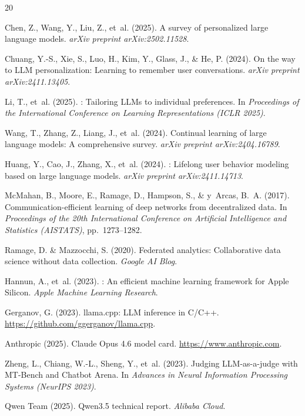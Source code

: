\documentclass[11pt,a4paper]{article}
\begin{document}
\begin{thebibliography}{20}

Chen, Z., Wang, Y., Liu, Z., et~al. (2025).
\newblock A survey of personalized large language models.
\newblock \emph{arXiv preprint arXiv:2502.11528}.

Chuang, Y.-S., Xie, S., Luo, H., Kim, Y., Glass, J., \& He, P. (2024).
\newblock On the way to {LLM} personalization: Learning to remember user
  conversations.
\newblock \emph{arXiv preprint arXiv:2411.13405}.

Li, T., et~al. (2025).
: Tailoring {LLMs} to individual preferences.
\newblock In \emph{Proceedings of the International Conference on Learning
  Representations (ICLR 2025)}.

Wang, T., Zhang, Z., Liang, J., et~al. (2024).
\newblock Continual learning of large language models: A comprehensive survey.
\newblock \emph{arXiv preprint arXiv:2404.16789}.

Huang, Y., Cao, J., Zhang, X., et~al. (2024).
: Lifelong user behavior modeling based on large language
  models.
\newblock \emph{arXiv preprint arXiv:2411.14713}.

McMahan, B., Moore, E., Ramage, D., Hampson, S., \& y~Arcas, B.~A. (2017).
\newblock Communication-efficient learning of deep networks from decentralized
  data.
\newblock In \emph{Proceedings of the 20th International Conference on
  Artificial Intelligence and Statistics (AISTATS)}, pp.\ 1273--1282.

Ramage, D. \& Mazzocchi, S. (2020).
\newblock Federated analytics: Collaborative data science without data
  collection.
\newblock \emph{Google AI Blog}.

Hannun, A., et~al. (2023).
: An efficient machine learning framework for {Apple Silicon}.
\newblock \emph{Apple Machine Learning Research}.

Gerganov, G. (2023).
\newblock llama.cpp: {LLM} inference in {C/C++}.
\newblock \url{https://github.com/ggerganov/llama.cpp}.

Anthropic (2025).
\newblock Claude {Opus} 4.6 model card.
\newblock \url{https://www.anthropic.com}.

Zheng, L., Chiang, W.-L., Sheng, Y., et~al. (2023).
\newblock Judging {LLM}-as-a-judge with {MT-Bench} and {Chatbot Arena}.
\newblock In \emph{Advances in Neural Information Processing Systems (NeurIPS
  2023)}.

Qwen Team (2025).
\newblock Qwen3.5 technical report.
\newblock \emph{Alibaba Cloud}.

\end{thebibliography}
\end{document}
